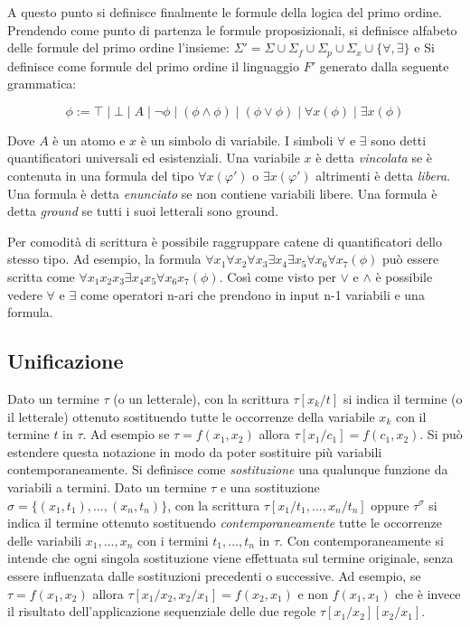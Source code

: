 \documentclass[./main.tex]{subfiles}
\begin{document}
A questo punto si definisce finalmente le formule della logica del primo ordine. Prendendo come punto di partenza le formule proposizionali,
si definisce alfabeto delle formule del primo ordine l'insieme: 
$\Sigma' = \Sigma \cup \Sigma_f \cup \Sigma_p \cup \Sigma_x \cup \{\forall, \exists\}$ 
e Si definisce come formule del primo ordine il linguaggio $F'$ generato dalla seguente grammatica:

$$ \phi := \top \mid \bot \mid A \mid \lnot \phi \mid (\phi \land \phi) \mid (\phi \lor \phi) \mid \forall x (\phi) \mid \exists x (\phi) $$

Dove $A$ è un atomo e $x$ è un simbolo di variabile. I simboli $\forall$ e $\exists$ sono detti quantificatori universali ed esistenziali.
Una variabile $x$ è detta \textit{vincolata} se è contenuta in una formula del tipo $\forall x (\varphi')$ o $\exists x (\varphi')$ 
altrimenti è detta \textit{libera}. Una formula è detta \textit{enunciato} se non contiene variabili libere. Una formula è detta 
\textit{ground} se tutti i suoi letterali sono ground.

Per comodità di scrittura è possibile raggruppare catene di quantificatori dello stesso tipo. Ad esempio, la formula 
$ \forall x_1 \forall x_2 \forall x_3 \exists x_4 \exists x_5 \forall x_6 \forall x_7 (\phi)$ può essere scritta come 
$\forall x_1 x_2 x_3 \exists x_4 x_5 \forall x_6 x_7 (\phi)$. Così come visto per $\lor$ e $\land$ è possibile vedere
$\forall$ e $\exists$ come operatori n-ari che prendono in input n-1 variabili e una formula.



\subsection{Unificazione}
Dato un termine $\tau$ (o un letterale), con la scrittura $\tau[x_k/t]$ si indica il termine (o il letterale) ottenuto sostituendo
tutte le occorrenze della variabile $x_k$ con il termine $t$ in $\tau$. Ad esempio se $\tau = f(x_1, x_2)$ allora $\tau[x_1/c_1] = f(c_1, x_2)$.
Si può estendere questa notazione in modo da poter sostituire più variabili contemporaneamente. 
Si definisce come \textit{sostituzione} una qualunque funzione da variabili a termini.
Dato un termine $\tau$ e una sostituzione $\sigma = \{(x_1, t_1), ..., (x_n, t_n)\}$,
con la scrittura $\tau[x_1/t_1, ..., x_n/t_n]$ oppure $\tau^\sigma$ si indica il termine ottenuto sostituendo \textit{contemporaneamente} 
tutte le occorrenze delle variabili $x_1, ..., x_n$ con i termini $t_1, ..., t_n$ in $\tau$.
Con contemporaneamente si intende che ogni singola sostituzione viene effettuata sul termine originale, 
senza essere influenzata dalle sostituzioni precedenti o successive.
Ad esempio, se $\tau = f(x_1, x_2)$ allora $\tau[x_1/x_2, x_2/x_1] = f(x_2, x_1)$ e non $f(x_1, x_1)$ 
che è invece il risultato dell'applicazione sequenziale delle due regole $\tau[x_1/x_2][x_2/x_1]$.
\end{document}
